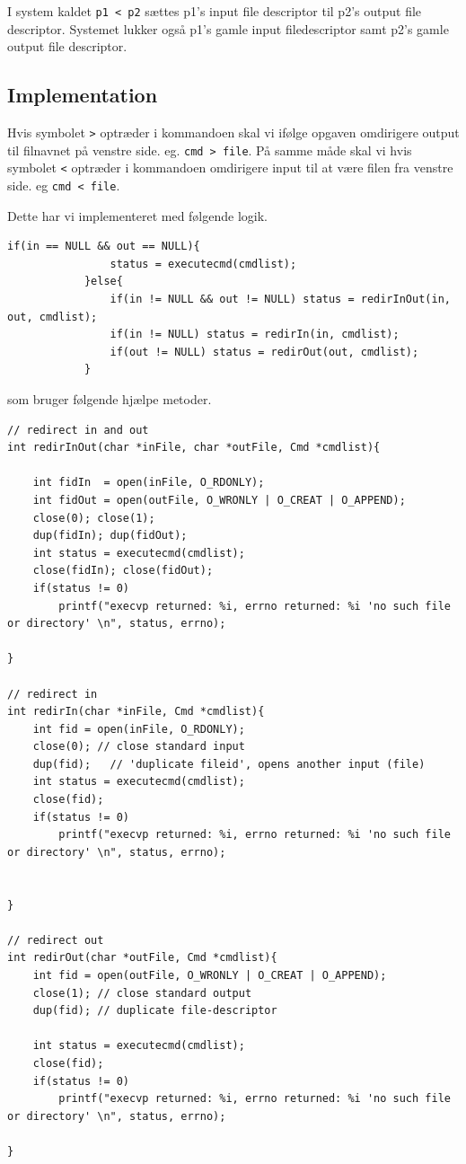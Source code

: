\documentclass[danish]{report}
\begin{document}
I system kaldet  {\tt p1 < p2} sættes p1's input file descriptor til p2's output file descriptor. Systemet lukker også p1's gamle input filedescriptor samt p2's gamle output file descriptor. 

   
\subsection{Implementation}
Hvis symbolet {\tt >} optræder i kommandoen skal vi ifølge opgaven omdirigere output til filnavnet på venstre side. eg. {\tt cmd > file}. På samme måde skal vi hvis symbolet {\tt <} optræder i kommandoen omdirigere input til at være filen fra venstre side. eg {\tt cmd < file}. 

Dette har vi implementeret med følgende logik.

\begin{lstlisting}
if(in == NULL && out == NULL){
                status = executecmd(cmdlist);
            }else{
                if(in != NULL && out != NULL) status = redirInOut(in, out, cmdlist);
                if(in != NULL) status = redirIn(in, cmdlist);
                if(out != NULL) status = redirOut(out, cmdlist);
            }
\end{lstlisting}

som bruger følgende hjælpe metoder.

\begin{lstlisting}
// redirect in and out
int redirInOut(char *inFile, char *outFile, Cmd *cmdlist){
    
    int fidIn  = open(inFile, O_RDONLY);
    int fidOut = open(outFile, O_WRONLY | O_CREAT | O_APPEND);              
    close(0); close(1);
    dup(fidIn); dup(fidOut);
    int status = executecmd(cmdlist);
    close(fidIn); close(fidOut);
    if(status != 0) 
        printf("execvp returned: %i, errno returned: %i 'no such file or directory' \n", status, errno);

}

// redirect in
int redirIn(char *inFile, Cmd *cmdlist){
    int fid = open(inFile, O_RDONLY);  
    close(0); // close standard input
    dup(fid);   // 'duplicate fileid', opens another input (file)    
    int status = executecmd(cmdlist);
    close(fid);             
    if(status != 0) 
        printf("execvp returned: %i, errno returned: %i 'no such file or directory' \n", status, errno);


}

// redirect out
int redirOut(char *outFile, Cmd *cmdlist){
    int fid = open(outFile, O_WRONLY | O_CREAT | O_APPEND);         
    close(1); // close standard output
    dup(fid); // duplicate file-descriptor

    int status = executecmd(cmdlist);
    close(fid);             
    if(status != 0) 
        printf("execvp returned: %i, errno returned: %i 'no such file or directory' \n", status, errno);

}
\end{lstlisting}
\end{document}
